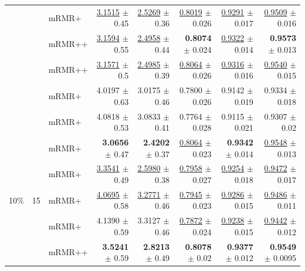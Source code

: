 \begin{longtable}{llp{}rrrrr}
 &  & mRMR+ & \underline{3.1515} {\scriptsize $\pm$ 0.45} & \underline{2.5269} {\scriptsize $\pm$ 0.36} & \underline{0.8019} {\scriptsize $\pm$ 0.026} & \underline{0.9291} {\scriptsize $\pm$ 0.017} & \underline{0.9509} {\scriptsize $\pm$ 0.016} \\
 &  & mRMR++ & \underline{3.1594} {\scriptsize $\pm$ 0.55} & \underline{2.4958} {\scriptsize $\pm$ 0.44} & \textbf{0.8074} {\scriptsize $\pm$ 0.024} & \underline{0.9322} {\scriptsize $\pm$ 0.014} & \textbf{0.9573} {\scriptsize $\pm$ 0.013} \\
 &  & mRMR++ & \underline{3.1571} {\scriptsize $\pm$ 0.5} & \underline{2.4985} {\scriptsize $\pm$ 0.39} & \underline{0.8064} {\scriptsize $\pm$ 0.026} & \underline{0.9316} {\scriptsize $\pm$ 0.016} & \underline{0.9540} {\scriptsize $\pm$ 0.015} \\
 &  & mRMR+ & 4.0197 {\scriptsize $\pm$ 0.63} & 3.0175 {\scriptsize $\pm$ 0.46} & 0.7800 {\scriptsize $\pm$ 0.026} & 0.9142 {\scriptsize $\pm$ 0.019} & 0.9334 {\scriptsize $\pm$ 0.018} \\
 &  & mRMR+ & 4.0818 {\scriptsize $\pm$ 0.53} & 3.0833 {\scriptsize $\pm$ 0.41} & 0.7764 {\scriptsize $\pm$ 0.028} & 0.9115 {\scriptsize $\pm$ 0.021} & 0.9307 {\scriptsize $\pm$ 0.02} \\
 &  & mRMR+ & \textbf{3.0656} {\scriptsize $\pm$ 0.47} & \textbf{2.4202} {\scriptsize $\pm$ 0.37} & \underline{0.8064} {\scriptsize $\pm$ 0.023} & \textbf{0.9342} {\scriptsize $\pm$ 0.014} & \underline{0.9548} {\scriptsize $\pm$ 0.013} \\
 &  & mRMR+ & \underline{3.3541} {\scriptsize $\pm$ 0.49} & \underline{2.5980} {\scriptsize $\pm$ 0.38} & \underline{0.7958} {\scriptsize $\pm$ 0.027} & \underline{0.9254} {\scriptsize $\pm$ 0.018} & \underline{0.9472} {\scriptsize $\pm$ 0.017} \\
\midrule
10\% & 15 & mRMR+ & \underline{4.0695} {\scriptsize $\pm$ 0.58} & \underline{3.2771} {\scriptsize $\pm$ 0.46} & \underline{0.7945} {\scriptsize $\pm$ 0.023} & \underline{0.9286} {\scriptsize $\pm$ 0.015} & \underline{0.9486} {\scriptsize $\pm$ 0.011} \\
 &  & mRMR+ & 4.1390 {\scriptsize $\pm$ 0.59} & 3.3127 {\scriptsize $\pm$ 0.46} & \underline{0.7872} {\scriptsize $\pm$ 0.024} & \underline{0.9238} {\scriptsize $\pm$ 0.015} & \underline{0.9442} {\scriptsize $\pm$ 0.012} \\
 &  & mRMR++ & \textbf{3.5241} {\scriptsize $\pm$ 0.59} & \textbf{2.8213} {\scriptsize $\pm$ 0.49} & \textbf{0.8078} {\scriptsize $\pm$ 0.02} & \textbf{0.9377} {\scriptsize $\pm$ 0.012} & \textbf{0.9549} {\scriptsize $\pm$ 0.0095} \\

\end{longtable}
